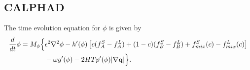 \subsection{CALPHAD}
The time evolution equation for $\phi$ is given by
%
\begin{equation}
\begin{split}
  \frac{d}{dt}\phi = {}
  M_\phi\Big\{ & \epsilon^2 \nabla^2 \phi
  - h'(\phi) \left[
  c (f_A^S- f_A^L) + (1 - c)(f_B^S - f_B^L)
  + f^S_{mix}(c) - f^L_{mix}(c) \right] \\
  & - \omega g'(\phi) - 2HTp'(\phi) | \nabla {\bf q} | \Big\} .
\label{eq:dphidtwithqCALPHAD}
\end{split}
\end{equation}
